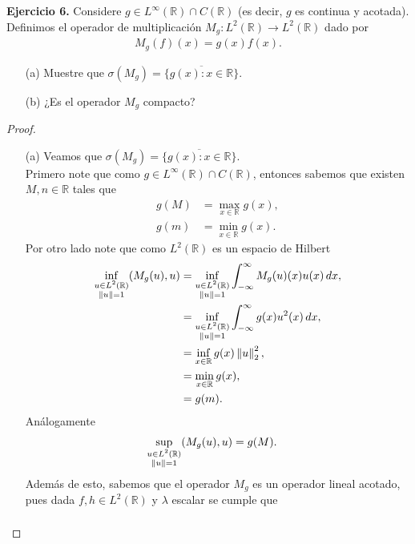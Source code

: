 \textbf{Ejercicio 6.} Considere $g\in L^\infty(\mathbb{R})\cap C(\mathbb{R})$ (es decir, $g$ es continua y acotada). Definimos el operador de multiplicación $M_g:L^2(\mathbb{R})\to L^2(\mathbb{R})$ dado por
\begin{align*}
    M_g(f)(x)=g(x)f(x).
\end{align*}
\begin{enumerate}
    \item[(a)] Muestre que $\sigma(M_g)=\overline{\{g(x):x\in \mathbb{R}\}}$.
    \item[(b)] ¿Es el operador $M_g$ compacto?
\end{enumerate}
\begin{proof} 
  \begin{enumerate}
    \item[(a)] Veamos que $\sigma(M_{g})=\overline{\{g(x):x\in \mathbb{R}\}}$.\\
      Primero note que como $g\in L^{\infty}(\mathbb{R})\cap C(\mathbb{R})$, entonces sabemos que existen $M,n\in \mathbb{R}$ tales que
      \begin{align*}
        g(M)&=\max_{x\in \mathbb{R}}g(x),\\
        g(m)&=\min_{x\in \mathbb{R}}g(x).
      \end{align*}
      Por otro lado note que como $L^2(\mathbb{R})$ es un espacio de Hilbert 
      \begin{align*}
        \inf_{\substack{u\in L^2(\mathbb{R})\\\left\|u\right\|=1}}(M_{g}(u),u)&=\inf_{\substack{u\in L^2(\mathbb{R})\\\left\|u\right\|=1}}\int_{-\infty}^{\infty}M_{g}(u)(x)u(x)\, dx,\\
        &=\inf_{\substack{u\in L^2(\mathbb{R})\\ \left\|u\right\|=1}}\int_{-\infty}^{\infty}g(x)u^2(x)\, dx,\\
        &=\inf_{x\in\mathbb{R}}g(x)\left\|u\right\|_{2}^2,\\
        &=\min_{x\in\mathbb{R}}g(x),\\
        &=g(m).
      \end{align*}
      Análogamente
      \begin{align*}
        \sup_{\substack{u\in L^2(\mathbb{R})\\ \left\|u\right\|=1}}(M_{g}(u),u)&=g(M). 
      \end{align*}
      Además de esto, sabemos que el operador $M_{g}$ es un operador lineal acotado, pues dada $f,h\in L^{2}(\mathbb{R})$ y $\lambda$ escalar se cumple que 
      \begin{align*}

\end{align*}
\end{enumerate}
\end{proof}

